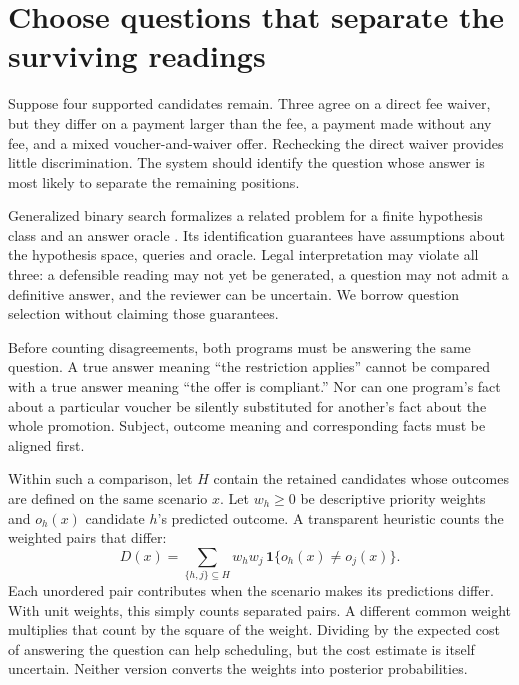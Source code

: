 \section{Choose questions that separate the surviving readings}
\label{merge:M05:08}


Suppose four supported candidates remain. Three agree on a direct fee waiver,
but they differ on a payment larger than the fee, a payment made without any fee,
and a mixed voucher-and-waiver offer. Rechecking the direct waiver provides
little discrimination. The system should identify the question whose answer is
most likely to separate the remaining positions.

Generalized binary search formalizes a related problem for a finite hypothesis
class and an answer oracle \citep[Figure 1 and sections I--II]{gbs2011}. Its
identification guarantees have assumptions about the hypothesis space, queries
and oracle. Legal interpretation may violate all three: a defensible reading may
not yet be generated, a question may not admit a definitive answer, and the
reviewer can be uncertain. We borrow question selection without claiming those
guarantees.


Before counting disagreements, both programs must be answering the same
question. A true answer meaning ``the restriction applies'' cannot be compared
with a true answer meaning ``the offer is compliant.'' Nor can one program's
fact about a particular voucher be silently substituted for another's fact about
the whole promotion. Subject, outcome meaning and corresponding facts must be
aligned first.

Within such a comparison, let $H$ contain the retained candidates whose outcomes
are defined on the same scenario $x$. Let $w_h\geq0$ be descriptive priority
weights and $o_h(x)$ candidate $h$'s predicted outcome. A transparent heuristic
counts the weighted pairs that differ:
\begin{equation}
 D(x)=\sum_{\{h,j\}\subseteq H}w_h w_j\,
       \mathbf{1}\{o_h(x)\ne o_j(x)\}.
 \label{eq:disagreement-question}
\end{equation}
Each unordered pair contributes when the scenario makes its predictions differ.
With unit weights, this simply counts separated pairs. A different common
weight multiplies that count by the square of the weight. Dividing by the expected
cost of answering the question can help scheduling, but the cost estimate is
itself uncertain. Neither version converts the weights into posterior
probabilities.

